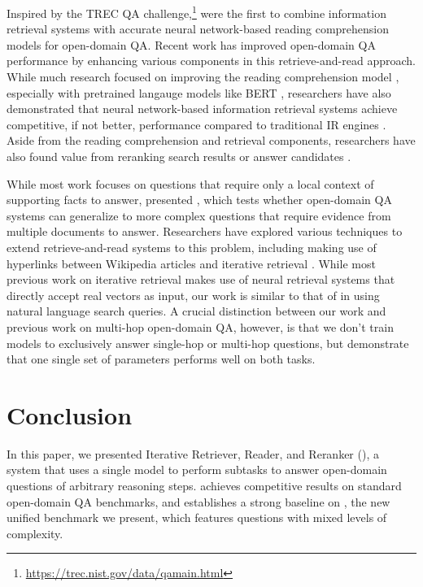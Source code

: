 Inspired by the TREC QA challenge,\footnote{\url{https://trec.nist.gov/data/qamain.html}} \citet{chen2017reading} were the first to combine information retrieval systems with accurate neural network-based reading comprehension models for open-domain QA.
Recent work has improved open-domain QA performance by enhancing various components in this retrieve-and-read approach.
While much research focused on improving the reading comprehension model \citep{seo2017bidirectional, clark-gardner-2018-simple}, especially with pretrained langauge models like BERT \citep{devlin2019bert}, researchers have also demonstrated that neural network-based information retrieval systems achieve competitive, if not better, performance compared to traditional IR engines \citep{lee2019latent, khattab2020relevance, guu2020realm, xiong2021answering}.
Aside from the reading comprehension and retrieval components, researchers have also found value from reranking search results \citep{wang2018reinforced} or answer candidates \citep{wang2018evidence, hu2019retrieve}.

While most work focuses on questions that require only a local context of supporting facts to answer, \citet{yang2018hotpotqa} presented \hotpotqa{}, which tests whether open-domain QA systems can generalize to more complex questions that require evidence from multiple documents to answer.
Researchers have explored various techniques to extend retrieve-and-read systems to this problem, including making use of hyperlinks between Wikipedia articles \citep{nie2019revealing, feldman2019multi, zhao2019transformer, asai2020learning, dhingra2020differentiable, zhao2019transformer} and iterative retrieval \citep{talmor2018web, das2019multi, qi2019answering}.
While most previous work on iterative retrieval makes use of neural retrieval systems that directly accept real vectors as input, our work is similar to that of \citet{qi2019answering} in using natural language search queries.
A crucial distinction between our work and previous work on multi-hop open-domain QA, however, is that we don't train models to exclusively answer single-hop or multi-hop questions, but demonstrate that one single set of parameters performs well on both tasks.
\section{Conclusion}

In this paper, we presented Iterative Retriever, Reader, and Reranker (\irrr{}), a system that uses a single model to perform subtasks to answer open-domain questions of arbitrary reasoning steps.
\irrr{} achieves competitive results on standard open-domain QA benchmarks, and establishes a strong baseline on \beerqa{}, the new unified benchmark we present, which features questions with mixed levels of complexity.

